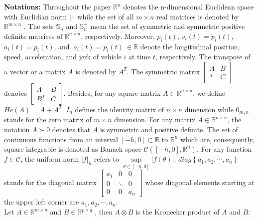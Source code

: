 \documentclass[a4paper]{cas-sc}
\begin{document}
\textbf{Notations:} Throughout the paper ${\mathbb{R}^n}$ denotes the n-dimensional Euclidean space with Euclidian norm $| \cdot |$  while the set of all $m \times n$ real matrices is denoted by ${\mathbb{R}^{m \times n}}$ . The sets $ {\mathbb{S}_n} $ and $\mathbb{S}_n^ + $ mean the set of symmetric and symmetric positive definite matrices of ${\mathbb{R}^{n \times n}}$, respectively. Moreover, $p_i\left(t\right)$, $v_i\left(t\right)={\dot{p}}_i\left(t\right)$, $a_i\left(t\right)={\ddot{p}}_i\left(t\right)$, and $\ {\dot{a}}_i\left(t\right)={\dddot{p}}_i\left(t\right)\ \in\mathbb{R}$ denote the longitudinal position, speed, acceleration, and jerk of vehicle $i$ at time $t$, respectively. The transpose of a vector or a matrix $A $ is denoted by ${A^T} $. The symmetric matrix $\left[ {\begin{array}{*{20}{c}}
          A & B \\
          * & C
        \end{array}} \right]$ denotes $\left[ {\begin{array}{*{20}{c}}
          A       & B \\
          {{B^T}} & C
        \end{array}} \right]$. Besides, for any square matrix $ A \in {\mathbb{R}^{n \times n}}$, we define $ He\left( A \right) = A + {A^T}$. ${I_n} $ defines the identity matrix of $ n \times n $ dimension while ${0_{m,n}} $ stands for the zero matrix of $ m \times n$ dimension. For any matrix $A \in {\mathbb{R}^{n \times n}} $, the notation $ A \succ 0$ denotes that $A $ is symmetric and positive definite. The set of continuous functions from an interval $\left[ { - h,0} \right] \subset \mathbb{R}$ to ${\mathbb{R}^n}$ which are, consequently, square integrable is denoted as Banach space $\mathcal{C}\left( {\left[ { - h,0} \right],{\mathbb{R}^n}} \right)$. For any function $f \in \mathcal{C}$, the uniform norm $|f{|_h}$ refers to $\mathop {\sup }\limits_{\theta  \in [ - h,0]} |f(\theta )|$. $diag\left\{ {{a_1},{a_2}, \cdots ,{a_n}} \right\}$ stands for the diagonal matrix $\left[ {\begin{array}{*{20}{c}}
          {{a_1}} & 0      & 0       \\
          0       & \ddots & 0       \\
          0       & 0      & {{a_n}}
        \end{array}} \right]$ whose diagonal elements starting at the upper left corner are ${a_1},{a_2}, \cdots ,{a_n}$.\\
Let $A \in {\mathbb{R}^{m \times n}}$ and $B \in {\mathbb{R}^{p \times q}}$ , then  $A \otimes B$ is the Kronecker product of $A$ and $B$:
\end{document}
